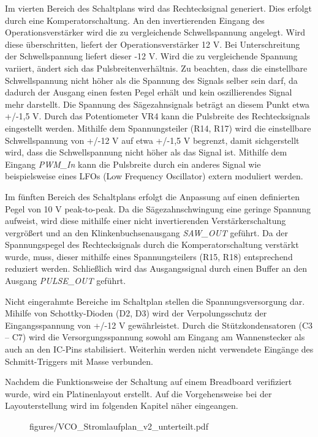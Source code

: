 Im vierten Bereich des Schaltplans wird das Rechtecksignal generiert. 
Dies erfolgt durch eine Komperatorschaltung.
An den invertierenden Eingang des Operationsverstärker wird die zu vergleichende Schwellspannung angelegt. 
Wird diese überschritten, liefert der Operationsverstärker 12 V. 
Bei Unterschreitung der Schwellspannung liefert dieser -12 V.
Wird die zu vergleichende Spannung variiert, ändert sich das Pulsbreitenverhältnis.
Zu beachten, dass die einstellbare Schwellspannung nicht höher als die Spannung des Signals selber sein darf, da dadurch der Ausgang einen festen Pegel erhält und kein oszillierendes Signal mehr darstellt.
Die Spannung des Sägezahnsignals beträgt an diesem Punkt etwa +/-1,5 V.
Durch das Potentiometer VR4 kann die Pulsbreite des Rechtecksignals eingestellt werden.
Mithilfe dem Spannungsteiler (R14, R17) wird die einstellbare Schwellspannung von +/-12 V auf etwa +/-1,5 V begrenzt, damit sichgerstellt wird, dass die Schwellspannung nicht höher als das Signal ist.
Mithilfe dem Eingang \textit{PWM\_In} kann die Pulsbreite durch ein anderes Signal wie beispielsweise eines LFOs (Low Frequency Oscillator) extern moduliert werden.

Im fünften Bereich des Schaltplans erfolgt die Anpassung auf einen definierten Pegel von 10 V peak-to-peak. 
Da die Sägezahnschwingung eine geringe Spannung aufweist, wird diese mithilfe einer nicht invertierenden Verstärkerschaltung vergrößert und an den Klinkenbuchsenausgang \textit{SAW\_OUT} geführt. 
Da der Spannungspegel des Rechtecksignals durch die Komperatorschaltung verstärkt wurde, muss, dieser mithilfe eines Spannungsteilers (R15, R18) entsprechend reduziert werden. 
Schließlich wird das Ausgangssignal durch einen Buffer an den Ausgang \textit{PULSE\_OUT} geführt.

Nicht eingerahmte Bereiche im Schaltplan stellen die Spannungsversorgung dar. 
Mihilfe von Schottky-Dioden (D2, D3) wird der Verpolungsschutz der Eingangsspannung von +/-12 V gewährleistet. 
Durch die Stützkondensatoren (C3 -- C7) wird die Versorgungsspannung sowohl am Eingang am Wannenstecker als auch an den IC-Pins stabilisiert.
Weiterhin werden nicht verwendete Eingänge des Schmitt-Triggers mit Masse verbunden.

Nachdem die Funktionsweise der Schaltung auf einem Breadboard verifiziert wurde, wird ein Platinenlayout erstellt.
Auf die Vorgehensweise bei der Layouterstellung wird im folgenden Kapitel näher eingeangen.

\newpage
\begin{figure}[h]
\centering
 {figures/VCO_Stromlaufplan_v2_unterteilt.pdf}
\label{fig:VCO_Stromlaufplan_v2}
\end{figure}

